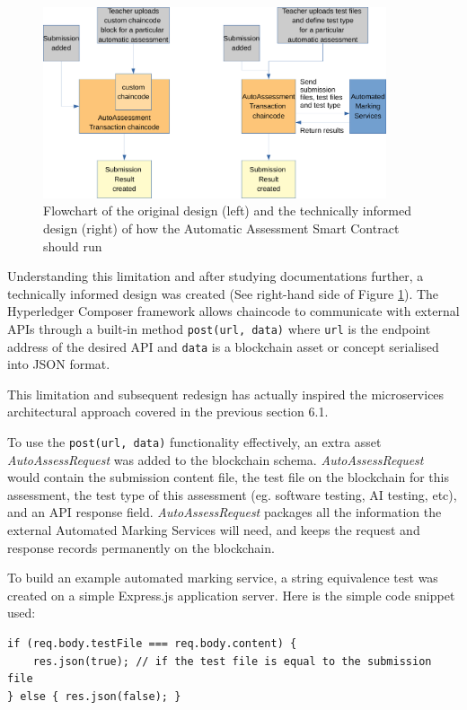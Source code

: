\begin{figure}[!ht]
	\centering
	\includegraphics[width=0.9\textwidth]{automarkinglim}
	\caption[AutoAssessment Smart Contract Design Change]
	{Flowchart of the original design (left) and the technically informed design (right) of how the Automatic Assessment Smart Contract should run}
	\label{fig:automarkinglim}
\end{figure}

Understanding this limitation and after studying documentations further, a technically informed design was created
(See right-hand side of Figure \ref{fig:automarkinglim}). The Hyperledger Composer framework allows chaincode
to communicate with external APIs through a built-in method \texttt{post(url, data)} where \texttt{url} is
the endpoint address of the desired API and \texttt{data} is a blockchain asset or concept serialised into JSON format.

This limitation and subsequent redesign has actually inspired the microservices architectural approach covered in the previous section 6.1.

To use the \texttt{post(url, data)} functionality effectively, an extra asset \textit{AutoAssessRequest} was added to the blockchain schema.
\textit{AutoAssessRequest} would contain the submission content file, the test file on the blockchain for this assessment, the test type of
this assessment (eg. software testing, AI testing, etc), and an API response field. \textit{AutoAssessRequest} packages all the information the external
Automated Marking Services will need, and keeps the request and response records permanently on the blockchain.

To build an example automated marking service, a string equivalence test was created on a simple Express.js application server.
Here is the simple code snippet used:
\begin{verbatim}
if (req.body.testFile === req.body.content) {
    res.json(true); // if the test file is equal to the submission file
} else { res.json(false); } 
\end{verbatim}

